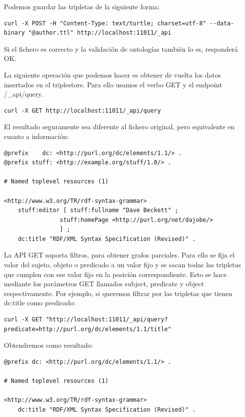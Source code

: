 \documentclass[12pt]{report} %
\begin{document}
Podemos guardar las tripletas de la siguiente forma:
\begin{verbatim}
curl -X POST -H "Content-Type: text/turtle; charset=utf-8" --data-binary "@author.ttl" http://localhost:11011/_api
\end{verbatim}

Si el fichero es correcto y la validación de ontologías también lo es, responderá OK.

La siguiente operación que podemos hacer es obtener de vuelta los datos insertados en el triplestore. Para ello usamos el verbo GET y el endpoint /\_api/query.

\begin{verbatim}
curl -X GET http://localhost:11011/_api/query
\end{verbatim}

El resultado seguramente sea diferente al fichero original, pero equivalente en cuanto a información:
\begin{verbatim}                                                 
@prefix    dc: <http://purl.org/dc/elements/1.1/> .
@prefix stuff: <http://example.org/stuff/1.0/> .

# Named toplevel resources (1)

<http://www.w3.org/TR/rdf-syntax-grammar>
    stuff:editor [ stuff:fullname "Dave Beckett" ;
                stuff:homePage <http://purl.org/net/dajobe/>
                ] ;
    dc:title "RDF/XML Syntax Specification (Revised)" .
\end{verbatim}

La API GET soporta filtros, para obtener grafos parciales. Para ello se fija el valor del sujeto, objeto o predicado a un valor fijo y se sacan todas las tripletas que cumplen con ese valor fijo en la posición correspondiente. Esto se hace mediante los parámetros GET llamados subject, predicate y object respectivamente. Por ejemplo, si queremos filtrar por las tripletas que tienen dc:title como predicado:

\begin{verbatim}
curl -X GET "http://localhost:11011/_api/query?predicate=http://purl.org/dc/elements/1.1/title"
\end{verbatim}

Obtendremos como resultado:
\begin{verbatim}
@prefix dc: <http://purl.org/dc/elements/1.1/> .

# Named toplevel resources (1)

<http://www.w3.org/TR/rdf-syntax-grammar>
    dc:title "RDF/XML Syntax Specification (Revised)" .
\end{verbatim}
\end{document}
